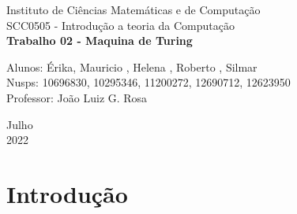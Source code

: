 \documentclass[a4paper, 12pt]{article}
\begin{document}

\begin{titlepage}
	\begin{center}
	

		\Huge{Instituto de Ciências Matemáticas e de Computação}\\
		\large{SCC0505 - Introdução a teoria da Computação}\\ 
		\vspace{15pt}
        \vspace{95pt}
        \textbf{\LARGE{Trabalho 02 - Maquina de Turing}}\\
		\vspace{3,5cm}
	\end{center}
	
	\begin{flushleft}
		\begin{tabbing}
			Alunos: Érika, Mauricio , Helena , Roberto , Silmar\\
            Nusps: 10696830, 10295346, 11200272, 12690712, 12623950 \\
			Professor: João Luiz G. Rosa\\
	\end{tabbing}
 \end{flushleft}
	\vspace{1cm}
	
	\begin{center}
		\vspace{\fill}
			 Julho\\
		 2022
			\end{center}
\end{titlepage}

\newpage
\newpage
\tableofcontents
\thispagestyle{empty}

\newpage
{}
\section{Introdução}
\end{document}
